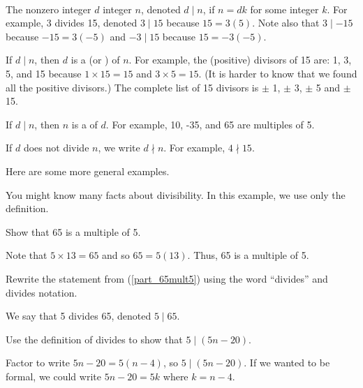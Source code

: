 \begin{defn}[Divides]
\label{defn_divides}
~
    \begin{apart}
        \item The nonzero integer $d$  integer $n$, denoted $d \mid n$, if $n = dk$ for some integer $k$.  For example, 3 divides 15, denoted $3 \mid 15$ because $15 = 3(5)$.  Note also that $3 \mid -15$ because $-15 = 3(-5)$ and $-3 \mid 15$ because $15 = -3(-5)$.
        
        \item If $d \mid n$, then $d$ is a   (or ) of $n$.  For example, the (positive) divisors of 15 are: 1, 3, 5, and 15 because $1 \times 15 = 15$ and $3 \times 5=15$. (It is harder to know that we found all the positive divisors.) The complete list of 15 divisors is $\pm$ 1, $\pm$ 3, $\pm$ 5 and $\pm$ 15.
        
        \item If $d \mid n$, then $n$ is a  of $d$.  For example, 10, -35, and 65 are multiples of 5.
        
        \item If $d$ does not divide $n$, we write $d \nmid n$.  For example, $4 \nmid 15$.
    \end{apart}
\end{defn}

Here are some more general examples.

\begin{exam}
\label{exam_divides_general}
    You might know many facts about divisibility. In this example, we use only the definition.
    \begin{apart}
        \item \label{part_65mult5} Show that 65 is a multiple of 5.
        \begin{soln}
            Note that $5 \times 13 = 65$ and so $65 = 5(13)$.  Thus, 65 is a multiple of 5.  
        \end{soln}
        \item Rewrite the statement from (\ref{part_65mult5}) using the word ``divides'' and divides notation.
        \begin{soln}
            We say that 5 divides 65, denoted $5 \mid 65$.
        \end{soln}  
        \item Use the definition of divides to show that $5 \mid (5n-20)$.
        \begin{soln}
            Factor to write $5n-20 = 5(n-4)$, so $5 \mid (5n-20)$. If we wanted to be formal, we could write $5n-20 = 5k$ where $k=n-4$.
        \end{soln}
    \end{apart}
\end{exam}

